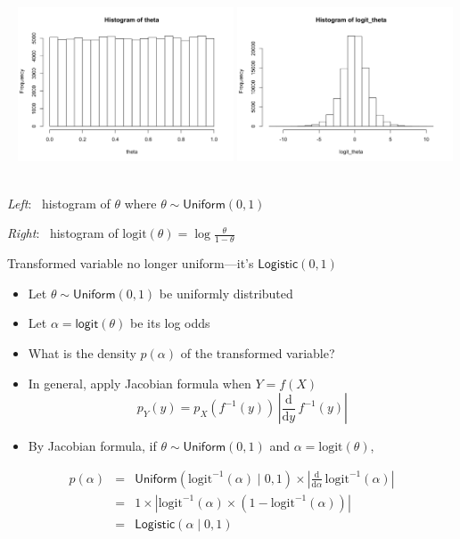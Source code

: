 \documentclass[10pt]{report}
\begin{document}
%

\mbox{ }
  \includegraphics[width=0.48\textwidth]{img/hist-unif01.png}
  \includegraphics[width=0.48\textwidth]{img/hist-logit-unif01.png}
\mbox{ }
%
\vspace*{-4pt}
\begin{subitemize}
\item \emph{Left}: \ histogram of $\theta$ where $\theta \sim \mathsf{Uniform}(0,1)$
\item \emph{Right}: \ histogram of $\displaystyle \mathrm{logit}(\theta) = \log
\frac{\theta}{1 - \theta}$
\item Transformed variable no longer uniform---it's
  $\mathsf{Logistic}(0, 1)$
\end{subitemize}


%
\begin{itemize}
\item Let $\theta \sim \mathsf{Uniform}(0, 1)$ be uniformly distributed
\item Let $\alpha = \mathsf{logit}(\theta)$ be its log odds
\item What is the density $p(\alpha)$ of the transformed variable?
\item In general, apply Jacobian formula when $Y = f(X)$
\[
p_Y(y) = p_X(f^{-1}(y))
\,
\left| \frac{\mathrm{d}}{\mathrm{d}y} \, f^{-1}(y) \right|
\]
\end{itemize}

%
\begin{itemize}
\item By Jacobian formula, if $\theta \sim \mathsf{Uniform}(0, 1)$
and $\alpha = \mathrm{logit}(\theta)$,
\end{itemize}
\begin{eqnarray*}
p(\alpha)
& = &
\mathsf{Uniform}(\mathrm{logit}^{-1}(\alpha) \mid 0, 1)
\times
\left| \frac{\mathrm{d}}{\mathrm{d}\alpha} \, \mathrm{logit}^{-1}(\alpha)
\right|
\\[6pt]
& = & 1 \times \left| \mathrm{logit}^{-1}(\alpha) \times \left( 1 -
      \mathrm{logit}^{-1}(\alpha)\right) \right|
\\[6pt]
& = & \mathsf{Logistic}(\alpha \mid 0, 1)
\end{eqnarray*}
\end{document}
